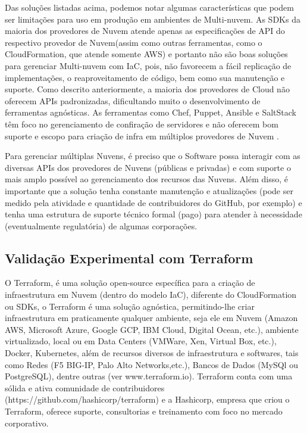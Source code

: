 \documentclass[12pt]{article}
\begin{document}
	Das soluções listadas acima, podemos notar algumas características que podem ser limitações para uso em produção em ambientes de Multi-nuvem. As SDKs da maioria dos provedores de Nuvem atende apenas as especificações de API do respectivo provedor de Nuvem(assim como outras ferramentas, como o CloudFormation, que atende somente AWS) e portanto não são boas soluções para gerenciar Multi-nuvem com IaC, pois, não favorecem a fácil replicação de implementações, o reaproveitamento de código, bem como sua manutenção e suporte. Como descrito anteriormente, a maioria dos provedores de Cloud não oferecem APIs padronizadas, dificultando muito o desenvolvimento de ferramentas agnósticas. As ferramentas como Chef, Puppet, Ansible e SaltStack têm foco no gerenciamento de confiração de servidores e não oferecem bom suporte e escopo para criação de infra em múltiplos provedores de Nuvem \cite{Morris:2016}.
	
	Para gerenciar múltiplas Nuvens, é preciso que o Software possa interagir com as diversas APIs dos provedores de Nuvens (públicas e privadas) e com suporte o mais amplo possível ao gerenciamento dos recursos das Nuvens. Além disso, é importante que a solução tenha constante manutenção e atualizações (pode ser medido pela atividade e quantidade de contribuidores do GitHub, por exemplo) e tenha uma estrutura de suporte técnico formal (pago) para atender à necessidade (eventualmente regulatória) de algumas corporações.
	
	\subsection{Validação Experimental com Terraform}
	
	O Terraform, é uma solução open-source específica para a criação de infraestrutura em Nuvem (dentro do modelo IaC), diferente do CloudFormation ou SDKs, o Terraform é uma solução agnóstica, permitindo-lhe criar infraestrutura em praticamente qualquer ambiente, seja ele em Nuvem (Amazon AWS, Microsoft Azure, Google GCP, IBM Cloud, Digital Ocean, etc.), ambiente virtualizado, local ou em Data Centers (VMWare, Xen, Virtual Box, etc.), Docker, Kubernetes, além de recursos diversos de infraestrutura e softwares, tais como Redes (F5 BIG-IP, Palo Alto Networks,etc.), Bancos de Dados (MySQl ou PostgreSQL), dentre outras (ver www.terraform.io). Terraform conta com uma sólida e ativa comunidade de contribuidores (https://github.com/hashicorp/terraform) e a Hashicorp, empresa que criou o Terraform, oferece suporte, consultorias e treinamento com foco no mercado corporativo.
	
\end{document}
